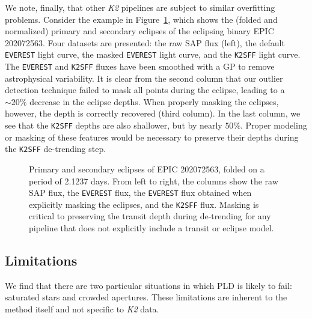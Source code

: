 \documentclass[]{emulateapj}
\begin{document}
We note, finally, that other \emph{K2} pipelines are subject to similar overfitting
problems. Consider the example in Figure~\ref{fig:202072563}, which shows 
the (folded and normalized) primary and secondary eclipses of the eclipsing binary EPIC 202072563. 
Four datasets are presented: the raw SAP flux (left), the default \texttt{EVEREST} light curve, 
the masked \texttt{EVEREST} light curve, and the \texttt{K2SFF} light curve. 
The \texttt{EVEREST} and \texttt{K2SFF} fluxes have been smoothed with a GP to 
remove astrophysical variability. It is clear from the second column that our outlier detection technique failed to 
mask all points during the eclipse, leading to a $\sim 20\%$ decrease in the eclipse
depths. When properly masking the eclipses, however, the depth is correctly recovered 
(third column). In the last column, we see that the \texttt{K2SFF} depths are also
shallower, but by nearly $50\%$. Proper modeling or masking of these features would be necessary to
preserve their depths during the \texttt{K2SFF} de-trending step.

\begin{figure}[h]
  \begin{center}
       \caption{Primary and secondary eclipses of EPIC 202072563, folded
                on a period of 2.1237 days. From left to right, the columns
                show the raw SAP flux, the \texttt{EVEREST} flux, the \texttt{EVEREST}
                flux obtained when explicitly masking the eclipses, and
                the \texttt{K2SFF} flux. Masking
                is critical to preserving the transit depth during de-trending
                for any pipeline that does not explicitly include a transit or
                eclipse model.}
     \label{fig:202072563}
  \end{center}
\end{figure}

\subsection{Limitations}
\label{sec:limitations}
We find that there are two particular situations in which PLD is likely to fail: saturated stars
and crowded apertures. These limitations are inherent to the method itself and not
specific to \emph{K2} data.
\end{document}
